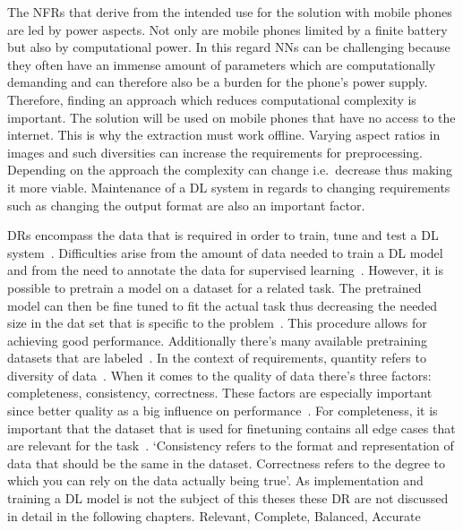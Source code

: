 The \acp{NFR} that derive from the intended use for the solution with mobile phones are led by
power aspects.
Not only are mobile phones limited by a finite battery but also by computational power.
In this regard \acp{NN} can be challenging because they often have an immense amount of parameters
which are computationally demanding and can therefore also be a burden for the phone's power supply.
Therefore, finding an approach which reduces computational complexity is important.
The solution will be used on mobile phones that have no access to the internet.
This is why the extraction must work offline.
Varying aspect ratios in images and such diversities can increase the requirements for preprocessing.
Depending on the approach the complexity can change i.e.\ decrease thus making it more viable.
Maintenance of a \ac{DL} system in regards to changing requirements such as changing the output
format are also an important factor.

\acp{DR} encompass the data that is required in order to train, tune and test a \ac{DL}
system~\cite{vogelsang_requirements_2019}.
Difficulties arise from the amount of data needed to train a \ac{DL} model and from the need to
annotate the data for supervised learning~\cite{nowruzi_how_2019}.
However, it is possible to pretrain a model on a dataset for a related task.
The pretrained model can then be fine tuned to fit the actual task thus decreasing the needed size
in the dat set that is specific to the problem~\cite{ouyang_factors_2016}.
This procedure allows for achieving good performance.
Additionally there's many available pretraining datasets that are labeled~\cite{ouyang_factors_2016}.
In the context of requirements, quantity refers to diversity of data~\cite{vogelsang_requirements_2019}.
When it comes to the quality of data there's three factors: completeness, consistency,
correctness.
These factors are especially important since better quality as a big influence on
performance~\cite{vogelsang_requirements_2019}.
For completeness, it is important that the dataset that is used for finetuning contains all edge
cases that are relevant for the task~\cite{arpteg_software_2018, vogelsang_requirements_2019}.
`Consistency refers to the format and representation of data that should be the same in the dataset. Correctness refers to the degree to which you can rely on the data actually being
true'\cite{vogelsang_requirements_2019}.
As implementation and training a \ac{DL} model is not the subject of this theses these \ac{DR} are
not discussed in detail in the following chapters.
Relevant, Complete, Balanced, Accurate~\cite{ashmore_assuring_2021}


